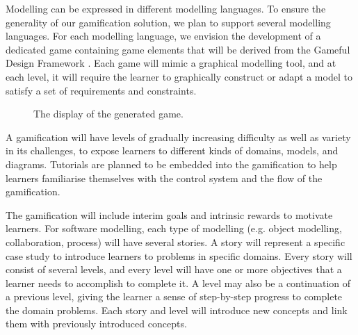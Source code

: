 \documentclass[12pt, a4paper]{report}
\begin{document}
{Modelling can be expressed in different modelling languages. To ensure the generality of our gamification solution, we plan to support several modelling languages. For each modelling language, we envision the development of a dedicated game containing game elements that will be derived from the Gameful Design Framework \cite{deterding2015lens}. Each game will mimic a graphical modelling tool, and at each level, it will require the learner to graphically construct or adapt a model to satisfy a set of requirements and constraints.

\begin{figure}[ht]
\centering
{}
\caption{The display of the generated game.}
\label{fig:001}
\end{figure}

A gamification will have levels of gradually increasing difficulty as well as variety in its challenges, to expose learners to different kinds of domains, models, and diagrams. Tutorials are planned to be embedded into the gamification to help learners familiarise themselves with the control system and the flow of the gamification. 

The gamification will include interim goals and intrinsic rewards to motivate learners. For software modelling, each type of modelling (e.g. object modelling, collaboration, process) will have several stories. A story will represent a specific case study to introduce learners to problems in specific domains. Every story will consist of several levels, and every level will have one or more objectives that a learner needs to accomplish to complete it. A level may also be a continuation of a previous level, giving the learner a sense of step-by-step progress to complete the domain problems. Each story and level will introduce new concepts and link them with previously introduced concepts.

}
\end{document}
